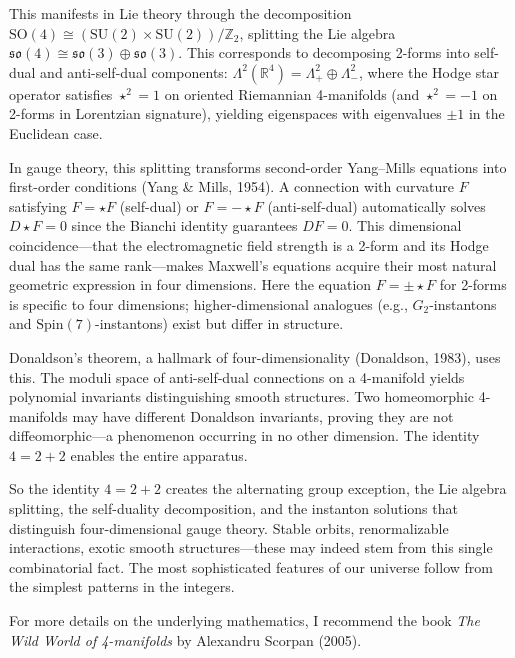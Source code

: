 This manifests in Lie theory through the decomposition $\mathrm{SO}(4) \cong (\mathrm{SU}(2) \times \mathrm{SU}(2))/\mathbb{Z}_2$, splitting the Lie algebra $\mathfrak{so}(4) \cong \mathfrak{so}(3) \oplus \mathfrak{so}(3)$. This corresponds to decomposing 2-forms into self-dual and anti-self-dual components: $\Lambda^2(\mathbb{R}^4) = \Lambda^2_+ \oplus\Lambda^2_-$, where the Hodge star operator satisfies $\star^2 = 1$ on oriented Riemannian 4-manifolds (and $\star^2 = -1$ on 2-forms in Lorentzian signature), yielding eigenspaces with eigenvalues $\pm 1$ in the Euclidean case.

In gauge theory, this splitting transforms second-order Yang–Mills equations into first-order conditions (Yang \& Mills, 1954). A connection with curvature $F$ satisfying $F = \star F$ (self-dual) or $F = -\star F$ (anti-self-dual) automatically solves $D\star F = 0$ since the Bianchi identity guarantees $DF = 0$. This dimensional coincidence—that the electromagnetic field strength is a 2-form and its Hodge dual has the same rank—makes Maxwell's equations acquire their most natural geometric expression in four dimensions. Here the equation $F=\pm \star F$ for 2-forms is specific to four dimensions; higher-dimensional analogues (e.g., $G_2$-instantons and $\mathrm{Spin}(7)$-instantons) exist but differ in structure.

Donaldson's theorem, a hallmark of four-dimensionality (Donaldson, 1983), uses this. The moduli space of anti-self-dual connections on a 4-manifold yields polynomial invariants distinguishing smooth structures. Two homeomorphic 4-manifolds may have different Donaldson invariants, proving they are not diffeomorphic—a phenomenon occurring in no other dimension. The identity $4 = 2 + 2$ enables the entire apparatus.

So the identity $4 = 2 + 2$ creates the alternating group exception, the Lie algebra splitting, the self-duality decomposition, and the instanton solutions that distinguish four-dimensional gauge theory. Stable orbits, renormalizable interactions, exotic smooth structures—these may indeed stem from this single combinatorial fact. The most sophisticated features of our universe follow from the simplest patterns in the integers.

For more details on the underlying mathematics, I recommend the book \textit{The Wild World of 4-manifolds} by Alexandru Scorpan (2005).

